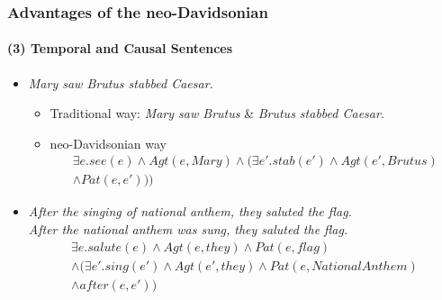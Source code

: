 \documentclass{beamer}
\begin{document}
\begin{frame}
    \frametitle{Advantages of the neo-Davidsonian}
    \framesubtitle{(3) Temporal and Causal Sentences}

    \begin{itemize}
        \item \emph{Mary saw Brutus stabbed Caesar.}
            \begin{itemize}
                \item Traditional way: \emph{Mary saw Brutus} \& \emph{Brutus stabbed Caesar}.
                \item neo-Davidsonian way \begin{gather*}
                        \exists e . see(e) \wedge Agt(e, Mary) \wedge (
                        \exists e' . stab(e') \wedge Agt(e', Brutus) \\
                        \wedge Pat(e, e')))
                    \end{gather*}
            \end{itemize}

        \item \emph{After the singing of national anthem, they saluted the flag.} \\
            \emph{After the national anthem was sung, they saluted the flag.} \begin{gather*}
                \exists e . salute(e) \wedge Agt(e, they) \wedge Pat(e, flag) \\
                \wedge (\exists e' . sing(e') \wedge Agt(e', they)
                \wedge Pat(e, NationalAnthem) \\
                \wedge after(e, e'))
            \end{gather*}

    \end{itemize}
\end{frame}
\end{document}
